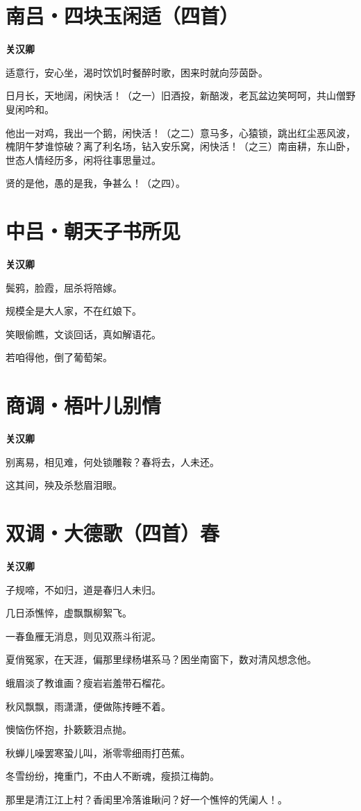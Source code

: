 \documentclass[12pt,a4paper]{ctexbook}
\begin{document}
\section{南吕・四块玉闲适（四首）}
\textbf{关汉卿}\par\vspace{0.5em}
适意行，安心坐，渴时饮饥时餐醉时歌，困来时就向莎茵卧。\par
日月长，天地阔，闲快活！（之一）旧酒投，新醅泼，老瓦盆边笑呵呵，共山僧野叟闲吟和。\par
他出一对鸡，我出一个鹅，闲快活！（之二）意马多，心猿锁，跳出红尘恶风波，槐阴午梦谁惊破？离了利名场，钻入安乐窝，闲快活！（之三）南亩耕，东山卧，世态人情经历多，闲将往事思量过。\par
贤的是他，愚的是我，争甚么！（之四）。\par

\section{中吕・朝天子书所见}
\textbf{关汉卿}\par\vspace{0.5em}
鬓鸦，脸霞，屈杀将陪嫁。\par
规模全是大人家，不在红娘下。\par
笑眼偷瞧，文谈回话，真如解语花。\par
若咱得他，倒了葡萄架。\par

\section{商调・梧叶儿别情}
\textbf{关汉卿}\par\vspace{0.5em}
别离易，相见难，何处锁雕鞍？春将去，人未还。\par
这其间，殃及杀愁眉泪眼。\par

\section{双调・大德歌（四首）春}
\textbf{关汉卿}\par\vspace{0.5em}
子规啼，不如归，道是春归人未归。\par
几日添憔悴，虚飘飘柳絮飞。\par
一春鱼雁无消息，则见双燕斗衔泥。\par
夏俏冤家，在天涯，偏那里绿杨堪系马？困坐南窗下，数对清风想念他。\par
蛾眉淡了教谁画？瘦岩岩羞带石榴花。\par
秋风飘飘，雨潇潇，便做陈抟睡不着。\par
懊恼伤怀抱，扑簌簌泪点抛。\par
秋蝉儿噪罢寒蛩儿叫，淅零零细雨打芭蕉。\par
冬雪纷纷，掩重门，不由人不断魂，瘦损江梅韵。\par
那里是清江江上村？香闺里冷落谁瞅问？好一个憔悴的凭阑人！。\par
\end{document}
